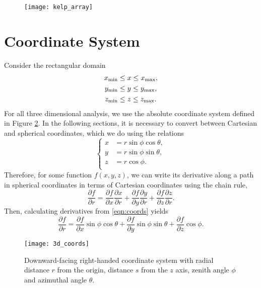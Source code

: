 \begin{figure}[H]
	\centering
	\texttt{[image: kelp\_array]}
  \label{fig:kelp_array}
\end{figure}

\section{Coordinate System}
Consider the rectangular domain
\begin{align*}
  {x_{\min}} &\leq x \leq {x_{\max}}, \\
  {y_{\min}} &\leq y \leq {y_{\max}}, \\
  {z_{\min}} &\leq z \leq {z_{\max}}.
\end{align*}
For all three dimensional analysis, we use the absolute coordinate system defined in Figure \ref{fig:3dcoords}.
In the following sections, it is necessary to convert between Cartesian and spherical coordinates, which we do using the relations
\begin{equation}
  \left\{
	\begin{split}
		x & = r\sin\phi\cos\theta, \\
		y & = r\sin\phi\sin\theta, \\
		z & = r\cos\phi. \\
	\end{split}
  \right.
	\label{eqn:coords}
\end{equation}
Therefore, for some function $f(x,y,z)$, we can write its derivative along a path in spherical coordinates in terms of Cartesian coordinates using the chain rule,
\begin{equation*}
	\frac{\partial f}{\partial r}
	=\frac{\partial f}{\partial x}\frac{\partial x}{\partial r}
	+ \frac{\partial f}{\partial y}\frac{\partial y}{\partial r}
	+ \frac{\partial f}{\partial z}\frac{\partial z}{\partial r}.
\end{equation*}
Then, calculating derivatives from \eqref{eqn:coords} yields
\begin{equation}
	\frac{\partial f}{\partial r}
	=\frac{\partial f}{\partial x}\sin\phi\cos\theta
	+ \frac{\partial f}{\partial y}\sin\phi\sin\theta
	+ \frac{\partial f}{\partial z}\cos\phi.
	\label{eqn:partials}
\end{equation}
\begin{figure}[H]
	\centering
	\texttt{[image: 3d\_coords]}
	\caption{Downward-facing right-handed coordinate system with radial distance $r$ from the origin, distance $s$ from the $z$ axis, zenith angle $\phi$ and azimuthal angle $\theta$.}
	\label{fig:3dcoords}
\end{figure}

